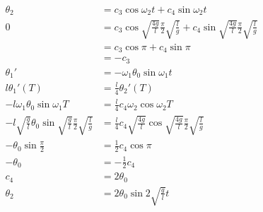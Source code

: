 \documentclass{article}
\begin{document}
\begin{enumerate}
        \begin{align*}
          \theta_2                                                                                & = c_3 \cos \omega_2 t + c_4 \sin \omega_2 t                                                                                     \\
          0                                                                                       & = c_3 \cos \sqrt{\frac{4g}{l}} \frac{\pi}{2} \sqrt{\frac{l}{g}} + c_4 \sin \sqrt{\frac{4g}{l}} \frac{\pi}{2} \sqrt{\frac{l}{g}} \\
                                                                                                  & = c_3 \cos \pi + c_4 \sin \pi                                                                                                   \\
                                                                                                  & = -c_3                                                                                                                          \\
          \theta_1'                                                                               & = -\omega_1 \theta_0 \sin \omega_1 t                                                                                            \\
          l \theta_1'(T)                                                                          & = \frac{l}{4} \theta_2'(T)                                                                                                      \\
          -l \omega_1 \theta_0 \sin \omega_1 T                                                    & = \frac{l}{4} c_4 \omega_2 \cos \omega_2 T                                                                                      \\
          -l \sqrt{\frac{g}{l}} \theta_0 \sin \sqrt{\frac{g}{l}} \frac{\pi}{2} \sqrt{\frac{l}{g}} & = \frac{l}{4} c_4 \sqrt{\frac{4g}{l}} \cos \sqrt{\frac{4g}{l}} \frac{\pi}{2} \sqrt{\frac{l}{g}}                                 \\
          -\theta_0 \sin \frac{\pi}{2}                                                            & = \frac{1}{2} c_4 \cos \pi                                                                                                      \\
          -\theta_0                                                                               & = -\frac{1}{2} c_4                                                                                                              \\
          c_4                                                                                     & = 2 \theta_0                                                                                                                    \\
          \theta_2                                                                                & = 2 \theta_0 \sin 2 \sqrt{\frac{g}{l}} t
        \end{align*}
\end{enumerate}
\end{document}
